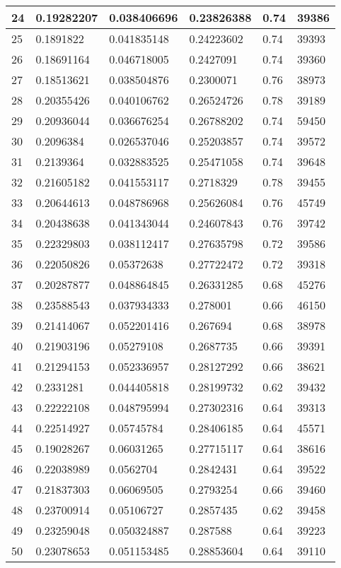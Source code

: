 \begin{longtable}{|l|l|l|l|l|l|}
24 & 0.19282207 & 0.038406696 & 0.23826388 & 0.74 & 39386 \\ \hline 
25 & 0.1891822 & 0.041835148 & 0.24223602 & 0.74 & 39393 \\ \hline 
26 & 0.18691164 & 0.046718005 & 0.2427091 & 0.74 & 39360 \\ \hline 
27 & 0.18513621 & 0.038504876 & 0.2300071 & 0.76 & 38973 \\ \hline 
28 & 0.20355426 & 0.040106762 & 0.26524726 & 0.78 & 39189 \\ \hline 
29 & 0.20936044 & 0.036676254 & 0.26788202 & 0.74 & 59450 \\ \hline 
30 & 0.2096384 & 0.026537046 & 0.25203857 & 0.74 & 39572 \\ \hline 
31 & 0.2139364 & 0.032883525 & 0.25471058 & 0.74 & 39648 \\ \hline 
32 & 0.21605182 & 0.041553117 & 0.2718329 & 0.78 & 39455 \\ \hline 
33 & 0.20644613 & 0.048786968 & 0.25626084 & 0.76 & 45749 \\ \hline 
34 & 0.20438638 & 0.041343044 & 0.24607843 & 0.76 & 39742 \\ \hline 
35 & 0.22329803 & 0.038112417 & 0.27635798 & 0.72 & 39586 \\ \hline 
36 & 0.22050826 & 0.05372638 & 0.27722472 & 0.72 & 39318 \\ \hline 
37 & 0.20287877 & 0.048864845 & 0.26331285 & 0.68 & 45276 \\ \hline 
38 & 0.23588543 & 0.037934333 & 0.278001 & 0.66 & 46150 \\ \hline 
39 & 0.21414067 & 0.052201416 & 0.267694 & 0.68 & 38978 \\ \hline 
40 & 0.21903196 & 0.05279108 & 0.2687735 & 0.66 & 39391 \\ \hline 
41 & 0.21294153 & 0.052336957 & 0.28127292 & 0.66 & 38621 \\ \hline 
42 & 0.2331281 & 0.044405818 & 0.28199732 & 0.62 & 39432 \\ \hline 
43 & 0.22222108 & 0.048795994 & 0.27302316 & 0.64 & 39313 \\ \hline 
44 & 0.22514927 & 0.05745784 & 0.28406185 & 0.64 & 45571 \\ \hline 
45 & 0.19028267 & 0.06031265 & 0.27715117 & 0.64 & 38616 \\ \hline 
46 & 0.22038989 & 0.0562704 & 0.2842431 & 0.64 & 39522 \\ \hline 
47 & 0.21837303 & 0.06069505 & 0.2793254 & 0.66 & 39460 \\ \hline 
48 & 0.23700914 & 0.05106727 & 0.2857435 & 0.62 & 39458 \\ \hline 
49 & 0.23259048 & 0.050324887 & 0.287588 & 0.64 & 39223 \\ \hline 
50 & 0.23078653 & 0.051153485 & 0.28853604 & 0.64 & 39110 \\ \hline 
\end{longtable}